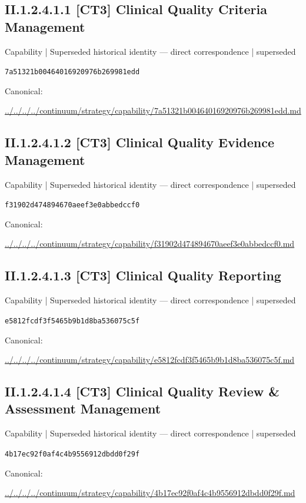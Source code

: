 \documentclass[10pt,a4paper]{article}
\begin{document}
\subsection*{II.1.2.4.1.1 [CT3] Clinical Quality Criteria Management}
{\small Capability | Superseded historical identity — direct correspondence | superseded}\par
\texttt{7a51321b00464016920976b269981edd}\par
Canonical: \par
{\footnotesize\url{../../../../continuum/strategy/capability/7a51321b00464016920976b269981edd.md}}\par
\subsection*{II.1.2.4.1.2 [CT3] Clinical Quality Evidence Management}
{\small Capability | Superseded historical identity — direct correspondence | superseded}\par
\texttt{f31902d474894670aeef3e0abbedccf0}\par
Canonical: \par
{\footnotesize\url{../../../../continuum/strategy/capability/f31902d474894670aeef3e0abbedccf0.md}}\par
\subsection*{II.1.2.4.1.3 [CT3] Clinical Quality Reporting}
{\small Capability | Superseded historical identity — direct correspondence | superseded}\par
\texttt{e5812fcdf3f5465b9b1d8ba536075c5f}\par
Canonical: \par
{\footnotesize\url{../../../../continuum/strategy/capability/e5812fcdf3f5465b9b1d8ba536075c5f.md}}\par
\subsection*{II.1.2.4.1.4 [CT3] Clinical Quality Review \& Assessment Management}
{\small Capability | Superseded historical identity — direct correspondence | superseded}\par
\texttt{4b17ec92f0af4c4b9556912dbdd0f29f}\par
Canonical: \par
{\footnotesize\url{../../../../continuum/strategy/capability/4b17ec92f0af4c4b9556912dbdd0f29f.md}}\par
\end{document}
